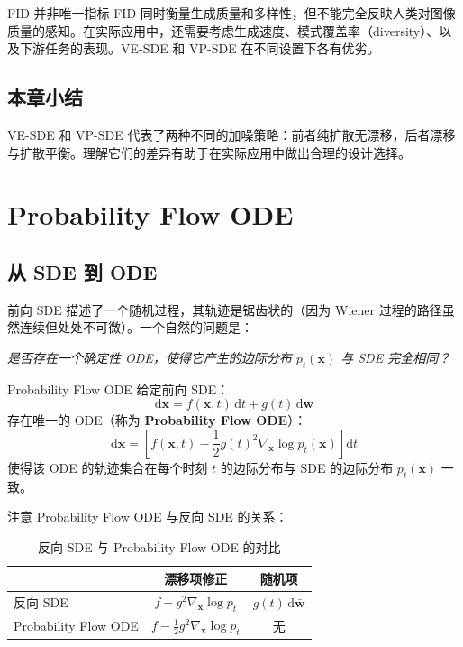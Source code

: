 \documentclass[a4paper]{article}
\begin{document}
\begin{warningbox}{FID 并非唯一指标}
FID 同时衡量生成质量和多样性，但不能完全反映人类对图像质量的感知。在实际应用中，还需要考虑生成速度、模式覆盖率（diversity）、以及下游任务的表现。VE-SDE 和 VP-SDE 在不同设置下各有优劣。
\end{warningbox}

\subsection{本章小结}

VE-SDE 和 VP-SDE 代表了两种不同的加噪策略：前者纯扩散无漂移，后者漂移与扩散平衡。理解它们的差异有助于在实际应用中做出合理的设计选择。


\section{Probability Flow ODE}

\subsection{从 SDE 到 ODE}

前向 SDE 描述了一个随机过程，其轨迹是锯齿状的（因为 Wiener 过程的路径虽然连续但处处不可微）。一个自然的问题是：

\textit{是否存在一个确定性 ODE，使得它产生的边际分布 $p_t(\mathbf{x})$ 与 SDE 完全相同？}

\begin{importantbox}{Probability Flow ODE}
给定前向 SDE：
$$
\mathrm{d}\mathbf{x} = f(\mathbf{x}, t)\,\mathrm{d}t + g(t)\,\mathrm{d}\mathbf{w}
$$
存在唯一的 ODE（称为 \textbf{Probability Flow ODE}）：
$$
\mathrm{d}\mathbf{x} = \left[f(\mathbf{x}, t) - \frac{1}{2}g(t)^2 \nabla_{\mathbf{x}} \log p_t(\mathbf{x})\right]\mathrm{d}t
$$
使得该 ODE 的轨迹集合在每个时刻 $t$ 的边际分布与 SDE 的边际分布 $p_t(\mathbf{x})$ 一致。
\end{importantbox}

注意 Probability Flow ODE 与反向 SDE 的关系：

\begin{table}[H]
\centering
\begin{tabular}{lcc}
\toprule
& \textbf{漂移项修正} & \textbf{随机项} \\
\midrule
反向 SDE & $f - g^2 \nabla_{\mathbf{x}} \log p_t$ & $g(t)\,\mathrm{d}\bar{\mathbf{w}}$ \\
Probability Flow ODE & $f - \frac{1}{2} g^2 \nabla_{\mathbf{x}} \log p_t$ & 无 \\
\bottomrule
\end{tabular}
\caption{反向 SDE 与 Probability Flow ODE 的对比}
\end{table}
\end{document}
